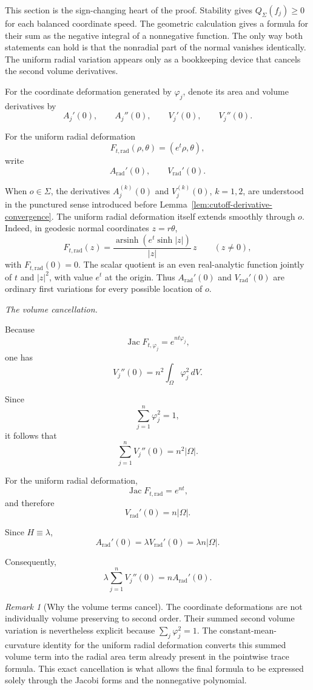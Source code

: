 \documentclass[11pt,reqno]{amsart}
\numberwithin{equation}{section}
\theoremstyle{definition}
\theoremstyle{remark}
\newtheorem{remark}[theorem]{Remark}
\newcommand{\Jac}{\operatorname{Jac}}
\newcommand{\ithead}[1]{%
  \par\medskip\noindent\textit{#1}\enspace
}
\begin{document}
This section is the sign-changing heart of the proof.  Stability gives
$Q_\Sigma(f_j)\ge0$ for each balanced coordinate speed.  The geometric
calculation gives a formula for their sum as the negative integral of a
nonnegative function.  The only way both statements can hold is that the
nonradial part of the normal vanishes identically.  The uniform radial
variation appears only as a bookkeeping device that cancels the second
volume derivatives.

For the coordinate deformation generated by \(\varphi_j\), denote its
area and volume derivatives by
\[
A_j'(0),
\qquad
A_j''(0),
\qquad
V_j'(0),
\qquad
V_j''(0).
\]

For the uniform radial deformation
\[
F_{t,\mathrm{rad}}(\rho,\theta)
=
(e^t\rho,\theta),
\]
write
\[
A_{\mathrm{rad}}'(0),
\qquad
V_{\mathrm{rad}}'(0).
\]

When \(o\in\Sigma\), the derivatives \(A_j^{(k)}(0)\) and
\(V_j^{(k)}(0)\), \(k=1,2\), are understood in the punctured sense
introduced before Lemma~\ref{lem:cutoff-derivative-convergence}. The
uniform radial deformation itself extends smoothly through \(o\). Indeed,
in geodesic normal coordinates \(z=r\theta\),
\[
F_{t,\mathrm{rad}}(z)
=
\frac{\operatorname{arsinh}(e^t\sinh |z|)}{|z|}\,z
\qquad (z\ne0),
\]
with \(F_{t,\mathrm{rad}}(0)=0\). The scalar quotient is an even
real-analytic function jointly of \(t\) and \(|z|^2\), with value \(e^t\)
at the origin.
Thus \(A_{\mathrm{rad}}'(0)\) and \(V_{\mathrm{rad}}'(0)\) are ordinary
first variations for every possible location of \(o\).

\ithead{The volume cancellation.}

Because
\[
\Jac F_{t,\varphi_j}
=
e^{nt\varphi_j},
\]
one has
\[
V_j''(0)
=
n^2\int_\Omega\varphi_j^2\,dV.
\]

Since
\[
\sum_{j=1}^n\varphi_j^2=1,
\]
it follows that
\[
\sum_{j=1}^nV_j''(0)
=
n^2|\Omega|.
\]

For the uniform radial deformation,
\[
\Jac F_{t,\mathrm{rad}}=e^{nt},
\]
and therefore
\[
V_{\mathrm{rad}}'(0)
=
n|\Omega|.
\]

Since \(H\equiv\lambda\),
\[
A_{\mathrm{rad}}'(0)
=
\lambda V_{\mathrm{rad}}'(0)
=
\lambda n|\Omega|.
\]

Consequently,
\begin{equation}
\lambda
\sum_{j=1}^nV_j''(0)
=
nA_{\mathrm{rad}}'(0).
\label{eq:volume-cancellation}
\end{equation}

\begin{remark}[Why the volume terms cancel]
The coordinate deformations are not individually volume preserving to
second order.  Their summed second volume variation is nevertheless
explicit because $\sum_j\varphi_j^2=1$.  The constant-mean-curvature
identity for the uniform radial deformation converts this summed volume
term into the radial area term already present in the pointwise trace
formula.  This exact cancellation is what allows the final formula to be
expressed solely through the Jacobi forms and the nonnegative polynomial.
\end{remark}
\end{document}
